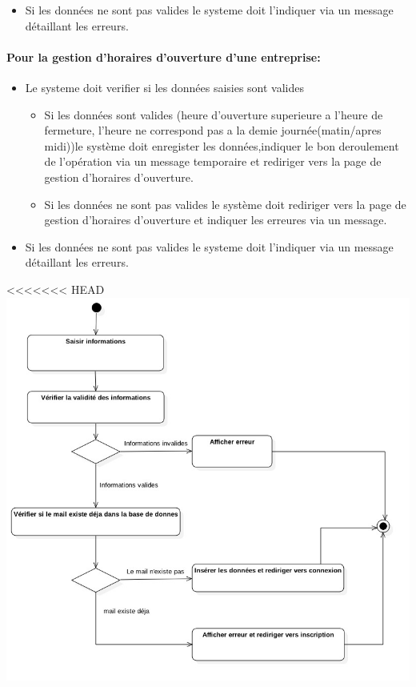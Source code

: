 \documentclass{article}
\begin{document}
\begin{itemize}
\begin{itemize}
\begin{itemize}
\item Si les données ne sont pas valides le systeme doit l'indiquer
	via un message détaillant les erreurs.
\end{itemize}

\paragraph{Pour la gestion d'horaires d'ouverture d'une entreprise: }
\begin{itemize}
\item Le systeme doit verifier si les données saisies sont valides
	
		\begin{itemize}
		\item Si les données sont valides (heure d'ouverture superieure a l'heure de fermeture, l'heure ne correspond pas a la demie journée(matin/apres midi))le système
			doit enregister les données,indiquer le bon deroulement de l'opération via un message temporaire et rediriger vers la page de gestion d'horaires d'ouverture.
		\item Si les données ne sont pas valides le système doit rediriger vers
			la page de gestion d'horaires d'ouverture et indiquer les erreures
			via un message.
		\end{itemize}

\item Si les données ne sont pas valides le systeme doit l'indiquer
	via un message détaillant les erreurs.
\end{itemize}

<<<<<<< HEAD
\includegraphics[scale=0.5]{ShematDiagrammes/activiteInscription.jpg}


\end{itemize}
\end{itemize}
\end{document}
